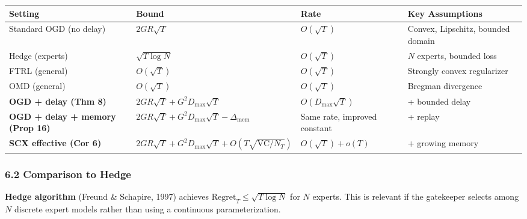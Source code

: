 \documentclass[
  12pt,
]{ctexart}
\begin{document}
\begin{longtable}[]{@{}
  >{\raggedright\arraybackslash}p{}
  >{\raggedright\arraybackslash}p{}
  >{\raggedright\arraybackslash}p{}
  >{\raggedright\arraybackslash}p{}@{}}
\toprule\noalign{}
\begin{minipage}[b]{\linewidth}\raggedright
Setting
\end{minipage} & \begin{minipage}[b]{\linewidth}\raggedright
Bound
\end{minipage} & \begin{minipage}[b]{\linewidth}\raggedright
Rate
\end{minipage} & \begin{minipage}[b]{\linewidth}\raggedright
Key Assumptions
\end{minipage} \\
\midrule\noalign{}
\endhead
\bottomrule\noalign{}
\endlastfoot
Standard OGD (no delay) & \(2GR\sqrt{T}\) & \(O(\sqrt{T})\) & Convex,
Lipschitz, bounded domain \\
Hedge (experts) & \(\sqrt{T \log N}\) & \(O(\sqrt{T})\) & \(N\) experts,
bounded loss \\
FTRL (general) & \(O(\sqrt{T})\) & \(O(\sqrt{T})\) & Strongly convex
regularizer \\
OMD (general) & \(O(\sqrt{T})\) & \(O(\sqrt{T})\) & Bregman
divergence \\
\textbf{OGD + delay (Thm 8)} & \(2GR\sqrt{T} + G^2 D_{\max}\sqrt{T}\) &
\(O(D_{\max}\sqrt{T})\) & + bounded delay \\
\textbf{OGD + delay + memory (Prop 16)} &
\(2GR\sqrt{T} + G^2 D_{\max}\sqrt{T} - \Delta_{\text{mem}}\) & Same
rate, improved constant & + replay \\
\textbf{SCX effective (Cor 6)} &
\(2GR\sqrt{T} + G^2 D_{\max}\sqrt{T} + O(T\sqrt{\text{VC}/N_T})\) &
\(O(\sqrt{T}) + o(T)\) & + growing memory \\
\end{longtable}

\subsubsection{6.2 Comparison to Hedge}\label{comparison-to-hedge}

\textbf{Hedge algorithm} (Freund \& Schapire, 1997) achieves
\(\text{Regret}_T \leq \sqrt{T \log N}\) for \(N\) experts. This is
relevant if the gatekeeper selects among \(N\) discrete expert models
rather than using a continuous parameterization.
\end{document}
